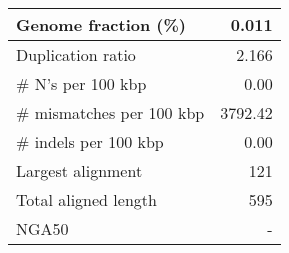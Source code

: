 \documentclass[12pt,a4paper]{article}
\begin{document}
\begin{table}[ht]
\begin{center}
\begin{tabular}{|l*{1}{|r}|}
Genome fraction (\%) & 0.011 \\ \hline
Duplication ratio & 2.166 \\ \hline
\# N's per 100 kbp & 0.00 \\ \hline
\# mismatches per 100 kbp & 3792.42 \\ \hline
\# indels per 100 kbp & 0.00 \\ \hline
Largest alignment & 121 \\ \hline
Total aligned length & 595 \\ \hline
NGA50 & - \\ \hline
\end{tabular}
\end{center}
\end{table}
\end{document}
